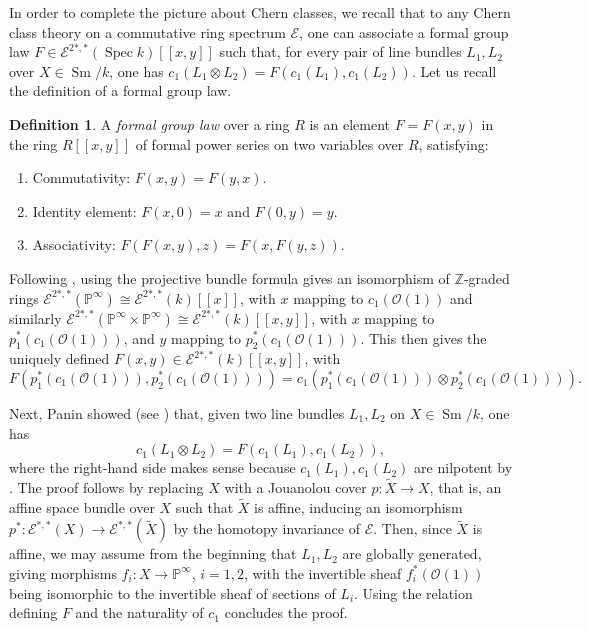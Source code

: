 \documentclass[10pt]{amsart}
\theoremstyle{definition}
\newtheorem{defn}{Definition}[section]
\theoremstyle{plain}
\numberwithin{equation}{section}
\newcommand{\0}{\emptyset}
\newcommand{\sE}{{\mathcal E}}
\newcommand{\sO}{{\mathcal O}}
\renewcommand{\P}{{\mathbb P}}
\newcommand{\Z}{{\mathbb Z}}
\newcommand{\Spec}{{\operatorname{Spec}}}
\newcommand{\Sm}{{\operatorname{Sm}}}
\begin{document}
In order to complete the picture about Chern classes, we recall that to any Chern class theory on a commutative ring spectrum $\sE$, one can associate a formal group law $F \in \sE^{2*,*}(\Spec k)[[x,y]]$ such that, for every pair of line bundles $L_1,L_2$ over $X \in \Sm/k$, one has $c_1(L_1 \otimes L_2)=F(c_1(L_1),c_1(L_2))$. Let us recall the definition of a formal group law.

\begin{defn}
    A \emph{formal group law} over a ring $R$ is an element $F=F(x,y)$ in the ring $R[[x,y]]$ of formal power series on two variables over $R$, satisfying:
    \begin{enumerate}
        \item Commutativity: $F(x,y)=F(y,x)$.
        \item Identity element: $F(x,0)=x$ and $F(0,y)=y$.
        \item Associativity: $F(F(x,y),z)=F(x,F(y,z))$.
    \end{enumerate}
\end{defn}

Following \cite[Section 3.9]{Pan:oriented}, using the projective bundle formula gives an isomorphism of $\Z$-graded rings $\sE^{2*,*}(\P^\infty)\cong \sE^{2*,*}(k)[[x]]$, with $x$ mapping to $c_1(\sO(1))$ and similarly $\sE^{2*,*}(\P^\infty\times\P^\infty)\cong \sE^{2*,*}(k)[[x,y]]$, with $x$ mapping to $p_1^*(c_1(\sO(1)))$, and $y$ mapping to $p_2^*(c_1(\sO(1)))$. This then gives the uniquely defined $F(x, y)\in  \sE^{2*,*}(k)[[x, y]]$, with 
\[
F(p_1^*(c_1(\sO(1))), p_2^*(c_1(\sO(1))))=c_1(p_1^*(c_1(\sO(1)))\otimes p_2^*(c_1(\sO(1)))).
\]

Next, Panin showed (see \cite[Proposition 3.37]{Pan:oriented}) that, given two line bundles $L_1, L_2$ on $X\in \Sm/k$, one has
\[
c_1(L_1\otimes L_2)=F(c_1(L_1), c_1(L_2)),
\]
where the right-hand side makes sense because $c_1(L_1), c_1(L_2)$ are nilpotent by \cite[Lemma 3.29]{Pan:oriented}. The proof follows by replacing $X$ with a Jouanolou cover $p:\tilde{X}\to X$, that is, an affine space bundle over $X$ such that $\tilde{X}$ is affine, inducing an isomorphism $p^*:\sE^{*,*}(X)\to \sE^{*,*}(\tilde{X})$ by the homotopy invariance of $\sE$. Then, since $\tilde{X}$ is affine, we may assume from the beginning that $L_1, L_2$ are globally generated, giving morphisms $f_i:X\to \P^\infty$, $i=1, 2$, with the invertible sheaf $f_i^*(\sO(1))$ being isomorphic to the invertible sheaf of sections of $L_i$. Using the relation defining $F$ and the naturality of $c_1$ concludes the proof.
\end{document}
